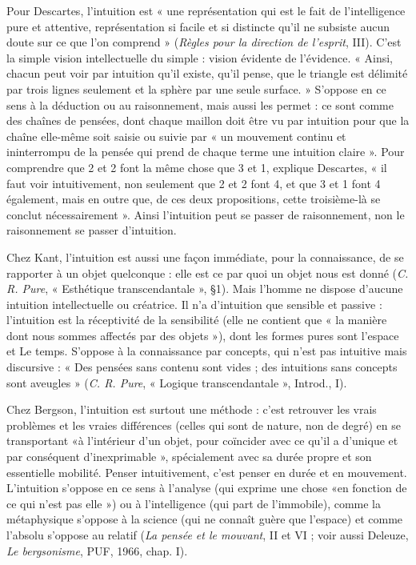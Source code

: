 {Pour Descartes, l'intuition est « une représentation qui est le fait de l’intelligence
pure et attentive, représentation si facile et si distincte qu’il ne subsiste
aucun doute sur ce que l’on comprend » ({\it Règles pour la direction de l'esprit}, III).
C’est la simple vision intellectuelle du simple : vision évidente de l'évidence.
« Ainsi, chacun peut voir par intuition qu’il existe, qu’il pense, que le triangle
est délimité par trois lignes seulement et la sphère par une seule surface. »
S’oppose en ce sens à la déduction ou au raisonnement, mais aussi les permet :
ce sont comme des chaînes de pensées, dont chaque maillon doit être vu par
intuition pour que la chaîne elle-même soit saisie ou suivie par « un mouvement
continu et ininterrompu de la pensée qui prend de chaque terme une
intuition claire ». Pour comprendre que 2 et 2 font la même chose que 3 et 1,
explique Descartes, « il faut voir intuitivement, non seulement que 2 et 2 font
4, et que 3 et 1 font 4 également, mais en outre que, de ces deux propositions,
cette troisième-là se conclut nécessairement ». Ainsi l'intuition peut se passer de
raisonnement, non le raisonnement se passer d’intuition.

Chez Kant, l'intuition est aussi une façon immédiate, pour la connaissance,
de se rapporter à un objet quelconque : elle est ce par quoi un objet nous est
donné ({\it C. R. Pure}, « Esthétique transcendantale », \S 1). Mais l’homme ne dispose
d'aucune intuition intellectuelle ou créatrice. Il n’a d’intuition que sensible
et passive : l'intuition est la réceptivité de la sensibilité (elle ne contient
que « la manière dont nous sommes affectés par des objets »), dont les formes
pures sont l’espace et Le temps. S’oppose à la connaissance par concepts, qui
n'est pas intuitive mais discursive : « Des pensées sans contenu sont vides ; des
intuitions sans concepts sont aveugles » ({\it C. R. Pure}, « Logique transcendantale »,
Introd., I).

Chez Bergson, l'intuition est surtout une méthode : c’est retrouver les vrais
problèmes et les vraies différences (celles qui sont de nature, non de degré) en
se transportant «à l’intérieur d’un objet, pour coïncider avec ce qu'il a
d’unique et par conséquent d’inexprimable », spécialement avec sa durée
propre et son essentielle mobilité. Penser intuitivement, c’est penser en durée
et en mouvement. L’intuition s'oppose en ce sens à l’analyse (qui exprime une
chose «en fonction de ce qui n’est pas elle ») ou à l'intelligence (qui part de
l'immobile), comme la métaphysique s'oppose à la science (qui ne connaît
guère que l’espace) et comme l'absolu s'oppose au relatif ({\it La pensée et le mouvant},
II et VI ; voir aussi Deleuze, {\it Le bergsonisme}, PUF, 1966, chap. I).

}
